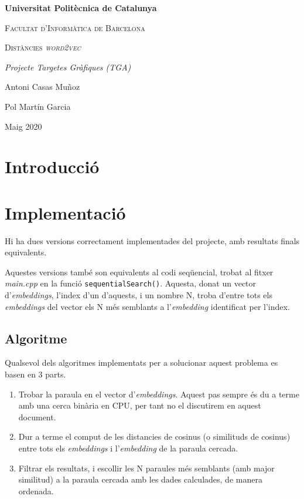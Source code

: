 \documentclass[catalan,10pt,a4paper]{article}
\begin{document}
	\begin{titlepage}
		\centering
		{\bfseries\LARGE Universitat Politècnica de Catalunya \par}
		\vspace{1cm}
		{\scshape\Large Facultat d'Informàtica de Barcelona\par}
		\vspace{3cm}
		{\scshape\Huge Distàncies \textit{word2vec} \par}
		\vspace{3cm}
		{\itshape\Large Projecte Targetes Gràfiques (TGA) \par}
		\vfill
		{\Large Antoni Casas Muñoz \par}
		{\Large Pol Martín Garcia \par}
		\vfill
		{\Large Maig 2020 \par}
	\end{titlepage}
	
	\newpage
	
	\section*{Introducció}
	
	\section*{Implementació}
	Hi ha dues versions correctament implementades del projecte, amb resultats finals equivalents.
	
	Aquestes versions també son equivalents al codi seqüencial, trobat al fitxer \textit{main.cpp} en la funció \verb|sequentialSearch()|. Aquesta, donat un vector d'\textit{embeddings}, l'index d'un d'aquests, i un nombre N, troba d'entre tots els \textit{embeddings} del vector els N més semblants a l'\textit{embedding} identificat per l'index.
	
	\subsection*{Algoritme}
	Qualsevol dels algoritmes implementats per a solucionar aquest problema es basen en 3 parts.
	\begin{enumerate}
		\item Trobar la paraula en el vector d'\textit{embeddings}. Aquest pas sempre és du a terme amb una cerca binària en CPU, per tant no el discutirem en aquest document.
		\item Dur a terme el comput de les distancies de cosinus (o similituds de cosinus) entre tots els \textit{embeddings} i l'\textit{embedding} de la paraula cercada.
		\item Filtrar els resultats, i escollir les N paraules més semblants (amb major similitud) a la paraula cercada amb les dades calculades, de manera ordenada.
	\end{enumerate}
	
\end{document}
